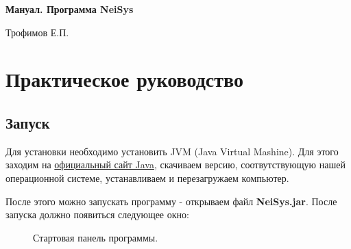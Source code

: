 \documentclass{article}
\numberwithin{equation}{section}
\begin{document}
\def\figurename{Рисунок}



\pagestyle{empty}
\begin{center}

{\LARGE\bf{Мануал. Программа NeiSys}}\par
\Large{Трофимов Е.П.}

\end{center}

\newpage



\setcounter{tocdepth}{2}  %
\tableofcontents


\newpage




\section{Практическое руководство}
\subsection{Запуск}


\qquad Для установки необходимо установить JVM (Java Virtual Mashine). Для этого заходим на \href{https://java.com/ru/download/manual.jsp}{официальный сайт Java}, скачиваем версию, соотвутствующую нашей операционной системе, устанавливаем и перезагружаем компьютер. 

После этого можно запускать программу - открываем файл {\bf NeiSys.jar}. После запуска должно появиться следующее окно:

\begin{figure}[h]
\caption{Стартовая панель программы.}
\label{ris:image}
\end{figure}
\end{document}

